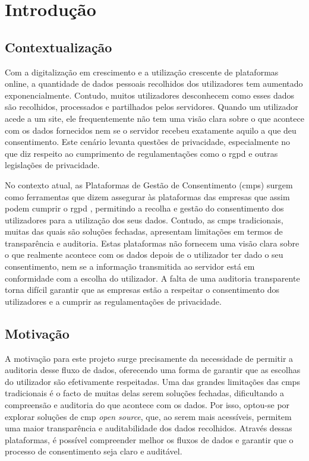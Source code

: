 \chapter{Introdução}


\section{Contextualização}

Com a digitalização em crescimento e a utilização crescente de plataformas online, a quantidade de dados pessoais recolhidos dos utilizadores tem aumentado exponencialmente. Contudo, muitos utilizadores desconhecem como esses dados são recolhidos, processados e partilhados pelos servidores. Quando um utilizador acede a um site, ele frequentemente não tem uma visão clara sobre o que acontece com os dados fornecidos nem se o servidor recebeu exatamente aquilo a que deu consentimento. Este cenário levanta questões de privacidade, especialmente no que diz respeito ao cumprimento de regulamentações como o \acrfull{rgpd} e outras legislações de privacidade.

No contexto atual, as Plataformas de Gestão de Consentimento (\acrshort{cmp}s) surgem como ferramentas que dizem assegurar às plataformas das empresas que assim podem cumprir o \acrshort{rgpd} \citep{Santos2021}, permitindo a recolha e gestão do consentimento dos utilizadores para a utilização dos seus dados. Contudo, as \acrshort{cmp}s tradicionais, muitas das quais são soluções fechadas, apresentam limitações em termos de transparência e auditoria. Estas plataformas não fornecem uma visão clara sobre o que realmente acontece com os dados depois de o utilizador ter dado o seu consentimento, nem se a informação transmitida ao servidor está em conformidade com a escolha do utilizador. A falta de uma auditoria transparente torna difícil garantir que as empresas estão a respeitar o consentimento dos utilizadores e a cumprir as regulamentações de privacidade.

\section{Motivação}

A motivação para este projeto surge precisamente da necessidade de permitir a auditoria desse fluxo de dados, oferecendo uma forma de garantir que as escolhas do utilizador são efetivamente respeitadas. Uma das grandes limitações das \acrshort{cmp}s tradicionais é o facto de muitas delas serem soluções fechadas, dificultando a compreensão e auditoria do que acontece com os dados. Por isso, optou-se por explorar soluções de \acrshort{cmp} \textit{open source}, que, ao serem mais acessíveis, permitem uma maior transparência e auditabilidade dos dados recolhidos. Através dessas plataformas, é possível compreender melhor os fluxos de dados e garantir que o processo de consentimento seja claro e auditável.

